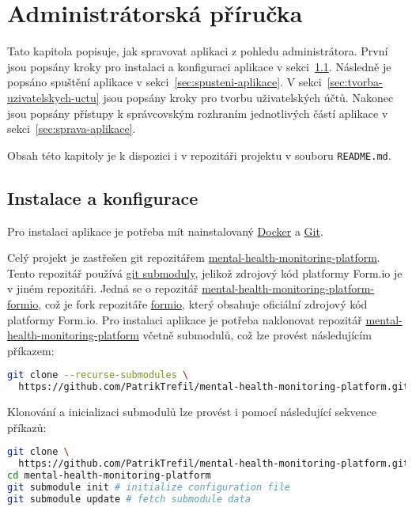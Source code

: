 \chapter{Administrátorská příručka}\label{ch:administratorska-prirucka}

Tato kapitola popisuje, jak spravovat aplikaci z pohledu administrátora.
První jsou popsány kroky pro instalaci a konfiguraci aplikace v sekci~\ref{sec:instalace}.
Následně je popsáno spuštění aplikace v sekci~\ref{sec:spusteni-aplikace}.
V sekci~\ref{sec:tvorba-uzivatelskych-uctu} jsou popsány kroky pro tvorbu uživatelských účtů.
Nakonec jsou popsány přístupy k správcovským rozhraním jednotlivých částí aplikace v sekci~\ref{sec:sprava-aplikace}.

Obsah této kapitoly je k dispozici i v repozitáři projektu v souboru \lstinline{README.md}.

\section{Instalace a konfigurace}\label{sec:instalace}

Pro instalaci aplikace je potřeba mít nainstalovaný \href{https://www.docker.com/}{Docker} a \href{https://git-scm.com/}{Git}.

Celý projekt je zastřešen git repozitářem \href{https://github.com/PatrikTrefil/mental-health-monitoring-platform.git}{mental-health-monitoring-platform}.
Tento repozitář používá \href{https://git-scm.com/book/en/v2/Git-Tools-Submodules}{git submoduly}, jelikož zdrojový kód platformy Form.io je v jiném repozitáři.
Jedná se o repozitář \href{https://github.com/PatrikTrefil/mental-health-monitoring-platform-formio}{mental-health-monitoring-platform-formio}, což je fork repozitáře \href{https://github.com/formio/formio}{formio}, který obsahuje oficiální zdrojový kód platformy Form.io.
Pro instalaci aplikace je potřeba naklonovat repozitář \href{https://github.com/PatrikTrefil/mental-health-monitoring-platform.git}{mental-health-monitoring-platform} včetně submodulů, což lze provést následujícím příkazem:

\begin{lstlisting}[language=bash]
git clone --recurse-submodules \
  https://github.com/PatrikTrefil/mental-health-monitoring-platform.git
\end{lstlisting}

Klonování a inicializaci submodulů lze provést i pomocí následující sekvence příkazů:

\begin{lstlisting}[language=bash]
git clone \
  https://github.com/PatrikTrefil/mental-health-monitoring-platform.git
cd mental-health-monitoring-platform
git submodule init # initialize configuration file
git submodule update # fetch submodule data
\end{lstlisting}


